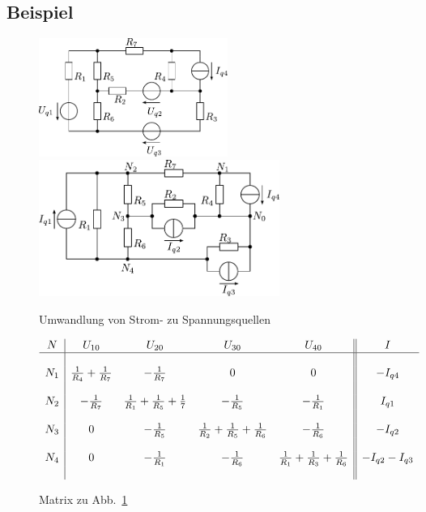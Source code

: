 \newpage
\subsection{Beispiel}

\begin{figure}[h!]
\centering
\includegraphics[width=0.55\textwidth]{knotpot_sch.pdf}
\includegraphics[width=0.7\textwidth]{knotpot_sch_2.pdf}
\label{sch:knotpot_2}
\caption{Umwandlung von Strom- zu Spannungsquellen}
\end{figure}

\begin{figure}[h!]
\footnotesize
\[ 	\begin{array}{c|cccc||c}
	N & U_{10}						& U_{20}										& U_{30} 											& U_{40} 											& I \\
	\hline &&&&& \\
	N_1	& \frac{1}{R_4} + \frac{1}{R_7}		& -\frac{1}{R_7} 								& 0 												& 0 												& -I_{q4} 			\\
	&&&&& \\
	N_2	& -\frac{1}{R_7} 					& \frac{1}{R_1} + \frac{1}{R_5} + \frac{1}{7} 	& -\frac{1}{R_5} 									& -\frac{1}{R_1} 									& I_{q1} 			\\ 
	&&&&& \\
	N_3	& 0 								& -\frac{1}{R_5} 								& \frac{1}{R_2} + \frac{1}{R_5} + \frac{1}{R_6} 	& -\frac{1}{R_6} 									& -I_{q2} 			\\ 
	&&&&& \\
	N_4 & 0 								& -\frac{1}{R_1} 								& -\frac{1}{R_6} 									& \frac{1}{R_1} + \frac{1}{R_3} + \frac{1}{R_6} 	& -I_{q2} -I_{q3} 	\\ 
	&&&&& \\
	\end{array}
\]
\normalsize
\caption{Matrix zu Abb.~\ref{sch:knotpot_2}}
\end{figure}

\newpage
